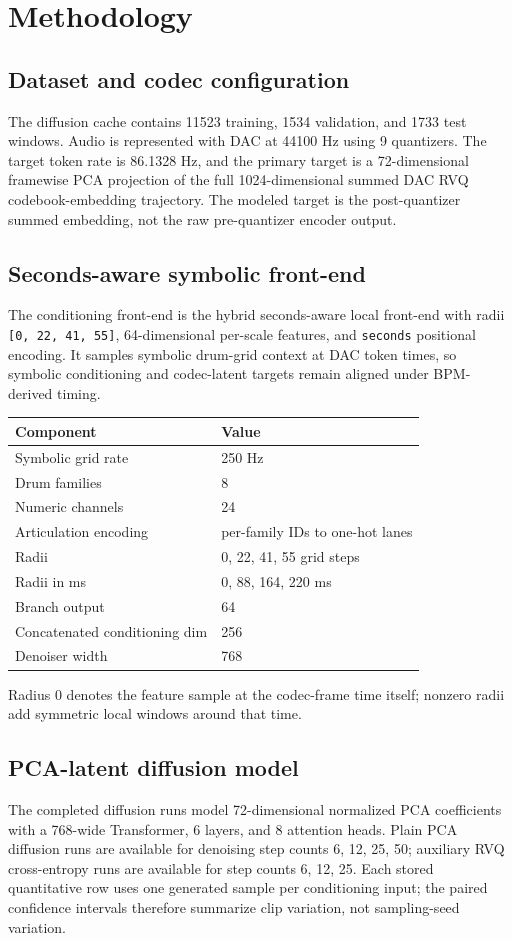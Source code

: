 \section{Methodology}
\subsection{Dataset and codec configuration}
The diffusion cache contains 11523 training, 1534 validation, and 1733 test windows. Audio is represented with DAC at 44100 Hz using 9 quantizers. The target token rate is 86.1328 Hz, and the primary target is a 72-dimensional framewise PCA projection of the full 1024-dimensional summed DAC RVQ codebook-embedding trajectory. The modeled target is the post-quantizer summed embedding, not the raw pre-quantizer encoder output.

\subsection{Seconds-aware symbolic front-end}
The conditioning front-end is the hybrid seconds-aware local front-end with radii \texttt{[0, 22, 41, 55]}, 64-dimensional per-scale features, and \texttt{seconds} positional encoding. It samples symbolic drum-grid context at DAC token times, so symbolic conditioning and codec-latent targets remain aligned under BPM-derived timing.
\begin{center}\small\begin{tabular}{ll}\toprule Component & Value \\ \midrule Symbolic grid rate & 250 Hz \\ Drum families & 8 \\ Numeric channels & 24 \\ Articulation encoding & per-family IDs to one-hot lanes \\ Radii & 0, 22, 41, 55 grid steps \\ Radii in ms & 0, 88, 164, 220 ms \\ Branch output & 64 \\ Concatenated conditioning dim & 256 \\ Denoiser width & 768 \\ \bottomrule\end{tabular}\end{center}
Radius 0 denotes the feature sample at the codec-frame time itself; nonzero radii add symmetric local windows around that time.

\subsection{PCA-latent diffusion model}
The completed diffusion runs model 72-dimensional normalized PCA coefficients with a 768-wide Transformer, 6 layers, and 8 attention heads. Plain PCA diffusion runs are available for denoising step counts 6, 12, 25, 50; auxiliary RVQ cross-entropy runs are available for step counts 6, 12, 25. Each stored quantitative row uses one generated sample per conditioning input; the paired confidence intervals therefore summarize clip variation, not sampling-seed variation.

